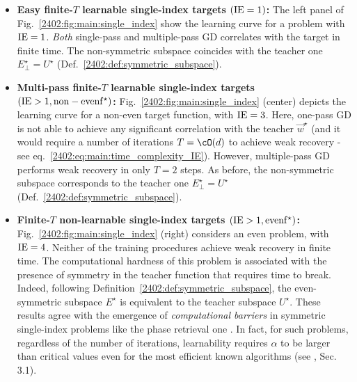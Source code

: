 \begin{itemize}
    \item \textbf{Easy finite-$T$ learnable single-index targets $\left(\rm{IE} = 1\right)$:} The left panel of Fig.~\ref{2402:fig:main:single_index} show the learning curve for a problem with $\rm{IE}  =  1$. {\it Both} single-pass and multiple-pass GD correlates with the target in finite time. The non-symmetric subspace coincides with the teacher one $E_\perp^\star = U^\star$ (Def.~\ref{2402:def:symmetric_subspace}).
    \item \textbf{Multi-pass finite-$T$ learnable single-index targets $\left(\rm IE > 1, \rm {non-even   f^\star} \right)$: }  Fig.~\ref{2402:fig:main:single_index} (center) depicts the learning curve for a non-even target function, with $\rm{IE} = 3$. Here, one-pass GD is not able to achieve any significant correlation with the teacher $\vec w^\star$ (and it would require a number of iterations $T = \cO(d)$ to achieve weak recovery - see eq.~\eqref{2402:eq:main:time_complexity_IE}). However, multiple-pass GD performs weak recovery in only $T=2$ steps. As before, the non-symmetric subspace corresponds to the teacher one $E_\perp^\star = U^\star$ (Def.~\ref{2402:def:symmetric_subspace}).
    \item \textbf{Finite-$T$ non-learnable single-index targets $\left(\rm{IE} > 1,     even    f^\star\right)$:} Fig.~\ref{2402:fig:main:single_index} (right) considers an even problem, with $\rm IE = 4$. Neither of the training procedures achieve weak recovery  in finite time. The computational hardness of this problem is associated with the presence of symmetry in the teacher function that requires time to break. Indeed, following Definition~\ref{2402:def:symmetric_subspace}, the even-symmetric subspace $E^\star$ is equivalent to the teacher subspace $U^\star$. These results agree with the emergence of \textit{computational barriers } in symmetric single-index problems like the phase retrieval one \citep{maillard2020phase}. In fact, for such problems, regardless of the number of iterations, learnability requires $\alpha$ to be larger than critical values even for the most efficient known algorithms (see \citep{barbier2019optimal}, Sec. 3.1).
    \end{itemize}

